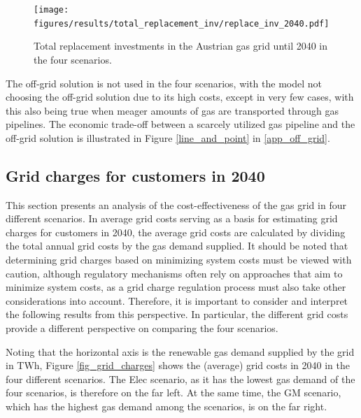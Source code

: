 \begin{figure}[h]
	\centering
	\texttt{[image: figures/results/total\_replacement\_inv/replace\_inv\_2040.pdf]}
	\caption{Total replacement investments in the Austrian gas grid until 2040 in the four scenarios.}
	\label{fig_grid_repl_inv}
\end{figure}

The off-grid solution is not used in the four scenarios, with the model not choosing the off-grid solution due to its high costs, except in very few cases, with this also being true when meager amounts of gas are transported through gas pipelines. The economic trade-off between a scarcely utilized gas pipeline and the off-grid solution is illustrated in Figure \ref{line_and_point} in \ref{app_off_grid}.

\subsection{Grid charges for customers in 2040}\label{res_grid_charges}
This section presents an analysis of the cost-effectiveness of the gas grid in four different scenarios. In average grid costs serving as a basis for estimating grid charges for customers in 2040, the average grid costs are calculated by dividing the total annual grid costs by the gas demand supplied. It should be noted that determining grid charges based on minimizing system costs must be viewed with caution, although regulatory mechanisms often rely on approaches that aim to minimize system costs, as a grid charge regulation process must also take other considerations into account. Therefore, it is important to consider and interpret the following results from this perspective. In particular, the different grid costs provide a different perspective on comparing the four scenarios.\vspace{0.3cm}

Noting that the horizontal axis is the renewable gas demand supplied by the grid in TWh, Figure \ref{fig_grid_charges} shows the (average) grid costs in 2040 in the four different scenarios. The Elec scenario, as it has the lowest gas demand of the four scenarios, is therefore on the far left. At the same time, the GM scenario, which has the highest gas demand among the scenarios, is on the far right. 

